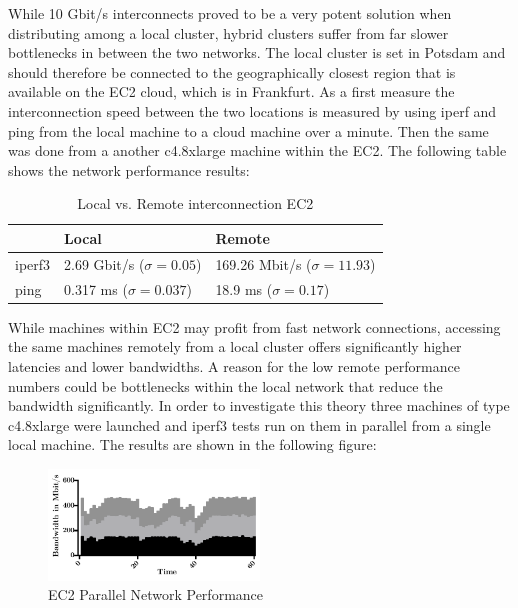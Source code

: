 While 10 Gbit/s interconnects proved to be a very potent solution when distributing among a local cluster, hybrid clusters suffer from far slower bottlenecks in between the two networks. The local cluster is set in Potsdam and should therefore be connected to the geographically closest region that is available on the EC2 cloud, which is in Frankfurt. As a first measure the interconnection speed between the two locations is measured by using iperf and ping from the local machine to a cloud machine over a minute. Then the same was done from a another c4.8xlarge machine within the EC2. The following table shows the network performance results:

\begin{table}[!htb]
	\centering
	\begin{adjustbox}{width=0.5\textwidth}
		\small
		\begin{tabular}{l | l | l}
			~                     & Local                 				& Remote                  \\
			\hline
			iperf3                & 2.69 Gbit/s ($\sigma = 0.05$) 		& 169.26 Mbit/s ($\sigma = 11.93$) \\
			ping                  & 0.317 ms ($\sigma = 0.037$)  		& 18.9 ms ($\sigma = 0.17$)  \\
		\end{tabular}
	\end{adjustbox}
	
	\caption{Local vs. Remote interconnection EC2}
	\label{table:local_vs_remote_ec2}
\end{table}

While machines within EC2 may profit from fast network connections, accessing the same machines remotely from a local cluster offers significantly higher latencies and lower bandwidths. A reason for the low remote performance numbers could be bottlenecks within the local network that reduce the bandwidth significantly. In order to investigate this theory three machines of type c4.8xlarge were launched and iperf3 tests run on them in parallel from a single local machine. The results are shown in the following figure:

\begin{figure}[H]
	\includegraphics[width=0.5\textwidth]{images/ec2_stacked_network_performance.pdf}
	\centering
	\caption{EC2 Parallel Network Performance}
	\label{img:EC2 Parallel Network Performance}
\end{figure}

